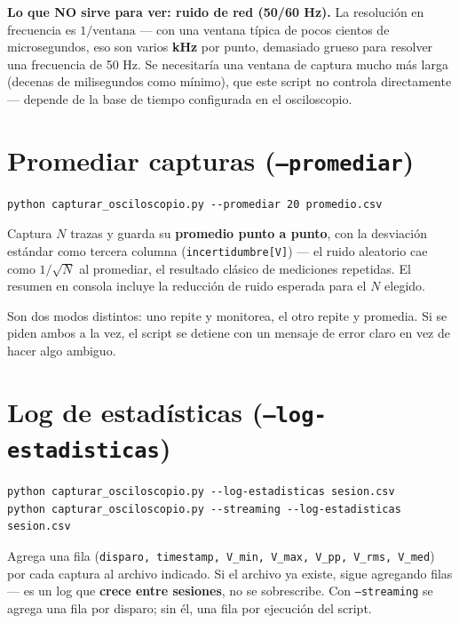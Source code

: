 \documentclass[11pt,a4paper]{article}
\begin{document}
\begin{aviso}
\textbf{Lo que NO sirve para ver: ruido de red (50/60 Hz).} La resolución
en frecuencia es $1/\text{ventana}$ --- con una ventana típica de pocos
cientos de microsegundos, eso son varios \textbf{kHz} por punto, demasiado
grueso para resolver una frecuencia de 50 Hz. Se necesitaría una ventana de
captura mucho más larga (decenas de milisegundos como mínimo), que este
script no controla directamente --- depende de la base de tiempo
configurada en el osciloscopio.
\end{aviso}

\section{Promediar capturas (\texttt{--promediar})}
\begin{lstlisting}
python capturar_osciloscopio.py --promediar 20 promedio.csv
\end{lstlisting}
Captura $N$ trazas y guarda su \textbf{promedio punto a punto}, con la
desviación estándar como tercera columna (\texttt{incertidumbre[V]}) ---
el ruido aleatorio cae como $1/\sqrt{N}$ al promediar, el resultado
clásico de mediciones repetidas. El resumen en consola incluye la
reducción de ruido esperada para el $N$ elegido.

\begin{nota}[title=No se combina con --streaming]
Son dos modos distintos: uno repite y monitorea, el otro repite y
promedia. Si se piden ambos a la vez, el script se detiene con un mensaje
de error claro en vez de hacer algo ambiguo.
\end{nota}

\section{Log de estadísticas (\texttt{--log-estadisticas})}
\begin{lstlisting}
python capturar_osciloscopio.py --log-estadisticas sesion.csv
python capturar_osciloscopio.py --streaming --log-estadisticas sesion.csv
\end{lstlisting}
Agrega una fila (\texttt{disparo, timestamp, V\_min, V\_max, V\_pp, V\_rms,
V\_med}) por cada captura al archivo indicado. Si el archivo ya existe,
sigue agregando filas --- es un log que \textbf{crece entre sesiones}, no
se sobrescribe. Con \texttt{--streaming} se agrega una fila por disparo;
sin él, una fila por ejecución del script.
\end{document}
